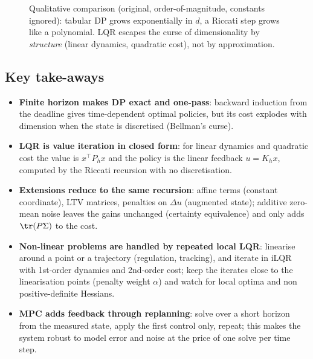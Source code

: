 \documentclass[11pt,a4paper]{article}
\theoremstyle{plain}
\theoremstyle{definition}
\theoremstyle{remark}
\begin{document}
\begin{figure}[H]
\centering
{}
\caption{Qualitative comparison (original, order-of-magnitude, constants ignored): tabular DP grows exponentially in $d$, a Riccati step grows like a polynomial. LQR escapes the curse of dimensionality by \emph{structure} (linear dynamics, quadratic cost), not by approximation.}
\end{figure}

\subsection{Key take-aways}

\begin{itemize}
  \item \textbf{Finite horizon makes DP exact and one-pass}: backward induction from the deadline gives time-dependent optimal policies, but its cost explodes with dimension when the state is discretised (Bellman's curse).
  \item \textbf{LQR is value iteration in closed form}: for linear dynamics and quadratic cost the value is $x^\top P_hx$ and the policy is the linear feedback $u=K_hx$, computed by the Riccati recursion with no discretisation.
  \item \textbf{Extensions reduce to the same recursion}: affine terms (constant coordinate), LTV matrices, penalties on $\Delta u$ (augmented state); additive zero-mean noise leaves the gains unchanged (certainty equivalence) and only adds $\tr(P\Sigma)$ to the cost.
  \item \textbf{Non-linear problems are handled by repeated local LQR}: linearise around a point or a trajectory (regulation, tracking), and iterate in iLQR with 1st-order dynamics and 2nd-order cost; keep the iterates close to the linearisation points (penalty weight $\alpha$) and watch for local optima and non positive-definite Hessians.
  \item \textbf{MPC adds feedback through replanning}: solve over a short horizon from the measured state, apply the first control only, repeat; this makes the system robust to model error and noise at the price of one solve per time step.
\end{itemize}
\end{document}
